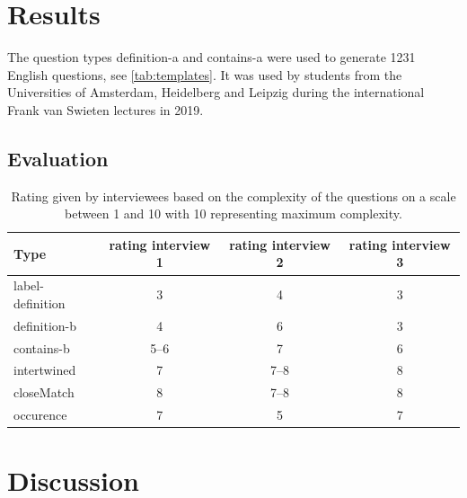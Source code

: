 \documentclass{IOS-Book-Article}     %
\begin{document}
\section{Results}\label{sec:application}
The question types definition-a and contains-a were used to generate 1231 English questions, see \cref{tab:templates}.
It was used by students from the Universities of Amsterdam, Heidelberg and Leipzig during the international Frank van Swieten lectures in 2019.


\subsection{Evaluation}
\begin{table}[h]
\begin{tabularx}{\textwidth}{Xccc}
\toprule
Type				&rating interview 1	&rating interview 2	&rating interview 3\\
\midrule
label-definition	&3				&4				&3\\
definition-b		&4				&6				&3\\
contains-b			&5--6			&7				&6\\
\midrule
intertwined			&7				&7--8			&8\\
closeMatch			&8				&7--8			&8\\
occurence			&7				&5				&7\\
\bottomrule
\end{tabularx}
\caption{Rating given by interviewees based on the complexity of the questions on a scale between 1 and 10 with 10 representing maximum complexity.}
\label{tabelle:eval_komplex}
\end{table}

\section{Discussion}




\end{document}
